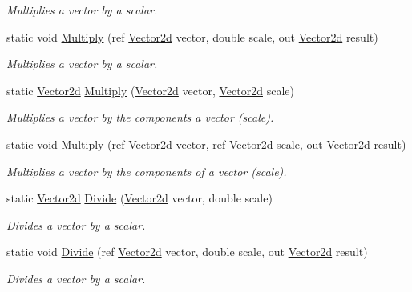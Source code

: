 \begin{DoxyCompactItemize}
\begin{DoxyCompactList}\small\item\em Multiplies a vector by a scalar. \end{DoxyCompactList}\item 
static void \hyperlink{struct_open_t_k_1_1_vector2d_abb63cc7484db05bad56ffc80ed425589}{Multiply} (ref \hyperlink{struct_open_t_k_1_1_vector2d}{Vector2d} vector, double scale, out \hyperlink{struct_open_t_k_1_1_vector2d}{Vector2d} result)
\begin{DoxyCompactList}\small\item\em Multiplies a vector by a scalar. \end{DoxyCompactList}\item 
static \hyperlink{struct_open_t_k_1_1_vector2d}{Vector2d} \hyperlink{struct_open_t_k_1_1_vector2d_aa1cb0a7d7febee295cf9e6951d4a99ec}{Multiply} (\hyperlink{struct_open_t_k_1_1_vector2d}{Vector2d} vector, \hyperlink{struct_open_t_k_1_1_vector2d}{Vector2d} scale)
\begin{DoxyCompactList}\small\item\em Multiplies a vector by the components a vector (scale). \end{DoxyCompactList}\item 
static void \hyperlink{struct_open_t_k_1_1_vector2d_af1e49cfbc565bba1ae86f390d56b9ca8}{Multiply} (ref \hyperlink{struct_open_t_k_1_1_vector2d}{Vector2d} vector, ref \hyperlink{struct_open_t_k_1_1_vector2d}{Vector2d} scale, out \hyperlink{struct_open_t_k_1_1_vector2d}{Vector2d} result)
\begin{DoxyCompactList}\small\item\em Multiplies a vector by the components of a vector (scale). \end{DoxyCompactList}\item 
static \hyperlink{struct_open_t_k_1_1_vector2d}{Vector2d} \hyperlink{struct_open_t_k_1_1_vector2d_af568798c385e9d498a4a8cc08977ba9f}{Divide} (\hyperlink{struct_open_t_k_1_1_vector2d}{Vector2d} vector, double scale)
\begin{DoxyCompactList}\small\item\em Divides a vector by a scalar. \end{DoxyCompactList}\item 
static void \hyperlink{struct_open_t_k_1_1_vector2d_a38ffee811bf1f1f12c5325b82a4011fd}{Divide} (ref \hyperlink{struct_open_t_k_1_1_vector2d}{Vector2d} vector, double scale, out \hyperlink{struct_open_t_k_1_1_vector2d}{Vector2d} result)
\begin{DoxyCompactList}\small\item\em Divides a vector by a scalar. \end{DoxyCompactList}\item 

\end{DoxyCompactItemize}
